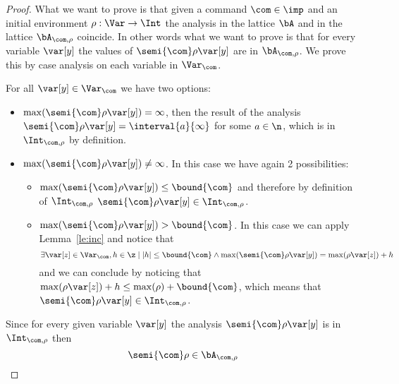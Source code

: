 \begin{proof}
  What we want to prove is that given a command \(\com\in\imp\) and an
  initial environment \(\rho : \Var \to \Int\) the analysis in the
  lattice \(\bA\) and in the lattice \(\bA_{\com,\rho}\) coincide. In
  other words what we want to prove is that for every variable
  \(\var[y]\) the values of \(\semi{\com}\rho\var[y]\) are in
  \(\bA_{\com,\rho}\). We prove this by case analysis on each variable
  in \(\Var_{\com}\).  \medskip

  \noindent
  For all \(\var[y] \in \Var_{\com}\) we have two options:
  \begin{itemize}
  \item \(\max(\semi{\com}\rho\var[y]) = \infty\), then the result of
    the analysis \(\semi{\com}\rho\var[y] = \interval{a}{\infty}\) for
    some \(a\in\n\), which is in \(\Int_{\com, \rho}\) by definition.
  \item \(\max(\semi{\com}\rho\var[y]) \neq \infty\). In this case we
    have again 2 possibilities:
    \begin{itemize}
    \item \(\max(\semi{\com}\rho\var[y]) \leq \bound{\com}\) and
      therefore by definition of \(\Int_{\com,\rho}\)
      \(\semi{\com}\rho\var[y] \in \Int_{\com, \rho}\).
      
    \item \(\max(\semi{\com}\rho\var[y]) > \bound{\com}\). In this
      case we can apply Lemma~\ref{le:inc} and notice that
      \begin{equation*}
        \exists \var[z] \in \Var_{\com}, h \in \z \mid \left|h\right| \leq \bound{\com} \wedge \max(\semi{\com}\rho\var[y]) = \max(\rho\var[z]) + h
      \end{equation*}
      and we can conclude by noticing that
      \(\max(\rho\var[z]) + h\leq \max(\rho) + \bound{\com}\), which
      means that \(\semi{\com}\rho\var[y] \in \Int_{\com, \rho}\).
    \end{itemize}
  \end{itemize}

  Since for every given variable \(\var[y]\) the analysis
  \(\semi{\com}\rho\var[y]\) is in \(\Int_{\com,\rho}\) then
  \[\semi{\com}\rho \in \bA_{\com,\rho}\]
\end{proof}